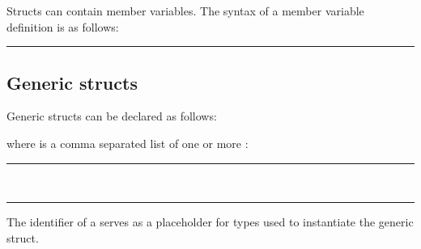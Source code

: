Structs can contain member variables. The syntax of a member variable definition
is as follows:

\begin{grammar}
\rule{member-variable-declaration}   \code{:}  \code{;}
\end{grammar}

\subsection{Generic structs}

Generic structs can be declared as follows:

\begin{grammar}
  \code{<}  \code{>} \code{\{}  \code{\}}
\end{grammar}

where  is a comma separated list of one or
more :

\begin{grammar}
\rule{generic-parameter} \\
\rule{generic-type-parameter} 
\end{grammar}

The identifier of a  serves as a placeholder
for types used to instantiate the generic struct.

